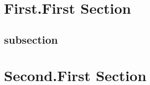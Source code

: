 \documentclass[11pt,twoside]{tubsartcl}
\begin{document}
\makeatletter
\makeatother

\sloppy
\lipsum[1]
\section{First.First Section}
\subsection{subsection}
\lipsum[2-25]
\lipsum[26]
\section{Second.First Section}
\lipsum[27-40]
\end{document}
